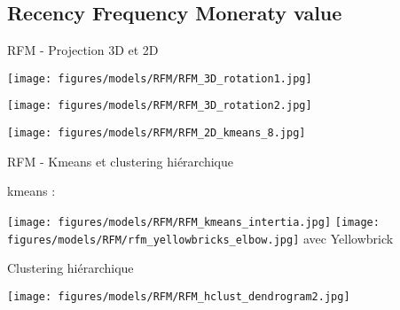 \documentclass[10pt]{beamer}
\begin{document}
\subsection{Recency Frequency Moneraty value}
\begin{frame}{RFM - Projection 3D et 2D}
    \begin{minipage}{0.48\linewidth}
        \begin{center}
           \texttt{[image: figures/models/RFM/RFM\_3D\_rotation1.jpg]}
        \end{center}
    \end{minipage}
    \begin{minipage}{0.48\linewidth}
        \begin{center}
           \texttt{[image: figures/models/RFM/RFM\_3D\_rotation2.jpg]}
        \end{center}
    \end{minipage}
    \begin{center}
       \texttt{[image: figures/models/RFM/RFM\_2D\_kmeans\_8.jpg]}
    \end{center}
\end{frame}
\begin{frame}{RFM - Kmeans et clustering hiérarchique}
    
    \begin{minipage}{0.45\linewidth}
        kmeans :
        \begin{center}
           \texttt{[image: figures/models/RFM/RFM\_kmeans\_intertia.jpg]}
           \texttt{[image: figures/models/RFM/rfm\_yellowbricks\_elbow.jpg]}
           {\tiny avec Yellowbrick}
        \end{center}
    \end{minipage}
    \begin{minipage}{0.52\linewidth}
        Clustering hiérarchique\\
        \begin{center}
           \texttt{[image: figures/models/RFM/RFM\_hclust\_dendrogram2.jpg]}
        \end{center}
    \end{minipage}

\end{frame}
\end{document}
